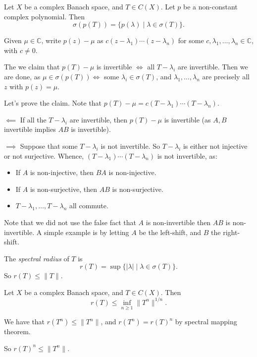 \documentclass[12pt]{article}
\begin{document}
\begin{theorem}
	Let $X$ be a complex Banach space, and $T \in C(X)$. Let $p$ be a non-constant complex polynomial. Then
	\[
		\sigma(p(T)) = \{p(\lambda) \mid \lambda \in \sigma(T)\}.
	\]
\end{theorem}

\begin{proofbox}
	Given $\mu \in \mathbb{C}$, write $p(z) - \mu$ as $c(z - \lambda_1) \cdots (z - \lambda_n)$ for some $c, \lambda_1, \ldots, \lambda_n \in \mathbb{C}$, with $c \neq 0$.

	The we claim that $p(T) - \mu$ is invertible $\iff$ all $T - \lambda_i$ are invertible. Then we are done, as $\mu \in \sigma(p(T)) \iff$ some $\lambda_i \in \sigma(T)$, and $\lambda_1, \ldots, \lambda_n$ are precisely all $z$ with $p(z) = \mu$.

	Let's prove the claim. Note that $p(T) - \mu = c(T - \lambda_1) \cdots (T - \lambda_n)$.

	$\impliedby$ If all the $T - \lambda_i$ are invertible, then $p(T) - \mu$ is invertible (as $A, B$ invertible implies $AB$ is invertible).

	$\implies$ Suppose that some $T - \lambda_i$ is not invertible. So $T - \lambda_i$ is either not injective or not surjective. Whence, $(T - \lambda_1) \cdots (T - \lambda_n)$ is not invertible, as:
	\begin{itemize}
		\item If $A$ is non-injective, then $BA$ is non-injective.
		\item If $A$ is non-surjective, then $AB$ is non-surjective.
		\item $T - \lambda_1, \ldots, T - \lambda_n$ all commute.
	\end{itemize}
\end{proofbox}

Note that we did not use the false fact that $A$ is non-invertible then $AB$ is non-invertible. A simple example is by letting $A$ be the left-shift, and $B$ the right-shift.

The \emph{spectral radius} of $T$ is
\[
	r(T) = \sup \{|\lambda| \mid \lambda \in \sigma(T)\}.
\]
So $r(T) \leq \|T\|$.

\begin{corollary}
	Let $X$ be a complex Banach space, and $T \in C(X)$. Then
	\[
	r(T) \leq \inf_{n \geq 1} \|T^{n}\|^{1/n}.
	\]
\end{corollary}

\begin{proofbox}
	We have that $r(T^{n}) \leq \|T^{n}\|$, and $r(T^{n}) = r(T)^{n}$ by spectral mapping theorem.

	So $r(T)^{n} \leq \|T^{n}\|$.
\end{proofbox}
\end{document}
